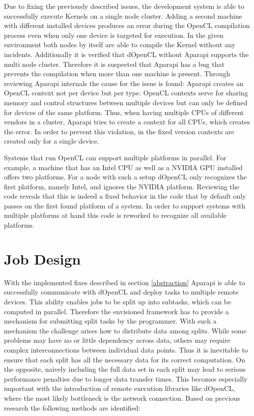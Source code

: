 \begin{description}[style=nextline]
	\item [Failed compilations when using multiple devices]
	Due to fixing the previously described issues, the development system is able to successfully execute Kernels on a single node cluster. Adding a second machine with different installed devices produces an error during the OpenCL compilation process even when only one device is targeted for execution. In the given environment both nodes by itself are able to compile the Kernel without any incidents. Additionally it is verified that dOpenCL without Aparapi supports the multi node cluster. Therefore it is suspected that Aparapi has a bug that prevents the compilation when more than one machine is present. Through reviewing Aparapi internals the cause for the issue is found: Aparapi creates an OpenCL context not per device but per type. OpenCL contexts serve for sharing memory and control structures between multiple devices but can only be defined for devices of the same platform. Thus, when having multiple CPUs of different vendors in a cluster, Aparapi tries to create a context for all CPUs, which creates the error. In order to prevent this violation, in the fixed version contexts are created only for a single device.

	\item [Multiple platforms per machine]
	Systems that run OpenCL can support multiple platforms in parallel. For example, a machine that has an Intel CPU as well as a NVIDIA GPU installed offers two platforms. For a node with such a setup dOpenCL only recognizes the first platform, namely Intel, and ignores the NVIDIA platform. Reviewing the code reveals that this is indeed a fixed behavior in the code that by default only passes on the first found platform of a system. In order to support systems with multiple platforms at hand this code is reworked to recognize all available platforms.

\end{description}


\section{Job Design}
\label{job_design}
With the implemented fixes described in section \ref{abstraction} Aparapi is able to successfully communicate with dOpenCL and deploy tasks to multiple remote devices. This ability enables jobs to be split up into subtasks, which can be computed in parallel. Therefore the envisioned framework has to provide a mechanism for submitting split tasks by the programmer. With such a mechanism the challenge arises how to distribute data among splits. While some problems may have no or little dependency across data, others may require complex interconnections between individual data points. Thus it is inevitable to ensure that each split has all the necessary data for its correct computation. On the opposite, naively including the full data set in each split may lead to serious performance penalties due to longer data transfer times. This becomes especially important with the introduction of remote execution libraries like dOpenCL, where the most likely bottleneck is the network connection. Based on previous research the following methods are identified:

